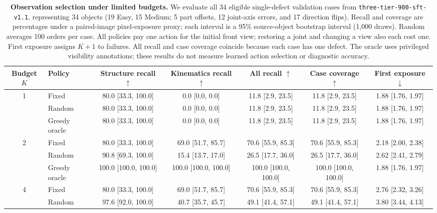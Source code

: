 \begin{table}[t]
  \centering
  \scriptsize
  \setlength{\tabcolsep}{3.2pt}
  \caption{\textbf{Observation selection under limited budgets.} We evaluate all 34 eligible single-defect validation cases from \texttt{three-tier-900-sft-v1.1}, representing 34 objects (19 Easy, 15 Medium; 5 part offsets, 12 joint-axis errors, and 17 direction flips). Recall and coverage are percentages under a paired-image pixel-exposure proxy; each interval is a 95\% source-object bootstrap interval (1,000 draws). Random averages 100 orders per case. All policies pay one action for the initial front view; restoring a joint and changing a view also each cost one. First exposure assigns $K+1$ to failures. All recall and case coverage coincide because each case has one defect. The oracle uses privileged visibility annotations; these results do not measure learned action selection or diagnostic accuracy.}
  \label{tab:oracle_selection}
  \begin{tabular}{@{}clccccc@{}}
    \toprule
    Budget $K$ & Policy & Structure recall $\uparrow$ & Kinematics recall $\uparrow$ & All recall $\uparrow$ & Case coverage $\uparrow$ & First exposure $\downarrow$ \\
    \midrule
    \multirow{3}{*}{1} & Fixed & 80.0 [33.3, 100.0] & 0.0 [0.0, 0.0] & 11.8 [2.9, 23.5] & 11.8 [2.9, 23.5] & 1.88 [1.76, 1.97] \\
     & Random & 80.0 [33.3, 100.0] & 0.0 [0.0, 0.0] & 11.8 [2.9, 23.5] & 11.8 [2.9, 23.5] & 1.88 [1.76, 1.97] \\
     & Greedy oracle & 80.0 [33.3, 100.0] & 0.0 [0.0, 0.0] & 11.8 [2.9, 23.5] & 11.8 [2.9, 23.5] & 1.88 [1.76, 1.97] \\
    \midrule
    \multirow{3}{*}{2} & Fixed & 80.0 [33.3, 100.0] & 69.0 [51.7, 85.7] & 70.6 [55.9, 85.3] & 70.6 [55.9, 85.3] & 2.18 [2.00, 2.38] \\
     & Random & 90.8 [69.3, 100.0] & 15.4 [13.7, 17.0] & 26.5 [17.7, 36.0] & 26.5 [17.7, 36.0] & 2.62 [2.41, 2.79] \\
     & Greedy oracle & 100.0 [100.0, 100.0] & 100.0 [100.0, 100.0] & 100.0 [100.0, 100.0] & 100.0 [100.0, 100.0] & 1.88 [1.76, 1.97] \\
    \midrule
    \multirow{3}{*}{4} & Fixed & 80.0 [33.3, 100.0] & 69.0 [51.7, 85.7] & 70.6 [55.9, 85.3] & 70.6 [55.9, 85.3] & 2.76 [2.32, 3.26] \\
     & Random & 97.6 [92.0, 100.0] & 40.7 [35.7, 45.7] & 49.1 [41.4, 57.1] & 49.1 [41.4, 57.1] & 3.80 [3.44, 4.13] \\

\end{tabular}
\end{table}
